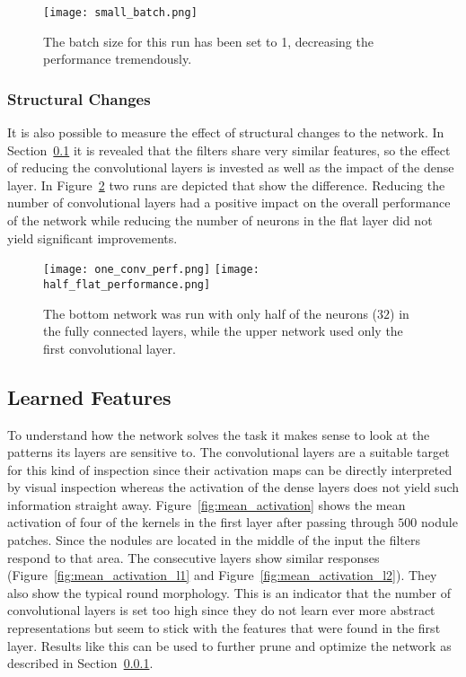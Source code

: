 \documentclass[main.tex]{subfiles}
\begin{document}
\begin{figure}[H]
\begin{center}
\texttt{[image: small\_batch.png]}
\end{center}
\caption{The batch size for this run has been set to 1, decreasing the performance tremendously.}
\label{fig:small_batch}
\end{figure}

\subsubsection{Structural Changes}\label{sss:struct_changes}
 
It is also possible to measure the effect of structural changes to the network. In Section~\ref{ss:features} it is revealed that the filters share very similar features, so the effect of reducing the convolutional layers is invested as well as the impact of the dense layer. In Figure~\ref{fig:structure_change} two runs are depicted that show the difference. Reducing the number of convolutional layers had a positive impact on the overall performance of the network while reducing the number of neurons in the flat layer did not yield significant improvements.


\begin{figure}[H]
\begin{center}
\texttt{[image: one\_conv\_perf.png]}
\texttt{[image: half\_flat\_performance.png]}
\end{center}
\caption{The bottom network was run with only half of the neurons ($32$) in the fully connected layers, while the upper network used only the first convolutional layer.}
\label{fig:structure_change}
\end{figure}


\subsection{Learned Features}\label{ss:features}
To understand how the network solves the task it makes sense to look at the patterns its layers are sensitive to. The convolutional layers are a suitable target for this kind of inspection since their activation maps can be directly interpreted by visual inspection whereas the activation of the dense layers does not yield such information straight away. Figure~\ref{fig:mean_activation} shows the mean activation of four of the kernels in the first layer after passing through $500$ nodule patches. Since the nodules are located in the middle of the input the filters respond to that area. The consecutive layers show similar responses (Figure~\ref{fig:mean_activation_l1} and Figure~\ref{fig:mean_activation_l2}). They also show the typical round morphology. This is an indicator that the number of convolutional layers is set too high since they do not learn ever more abstract representations but seem to stick with the features that were found in the first layer. Results like this can be used to further prune and optimize the network as described in Section~\ref{sss:struct_changes}.
\end{document}
